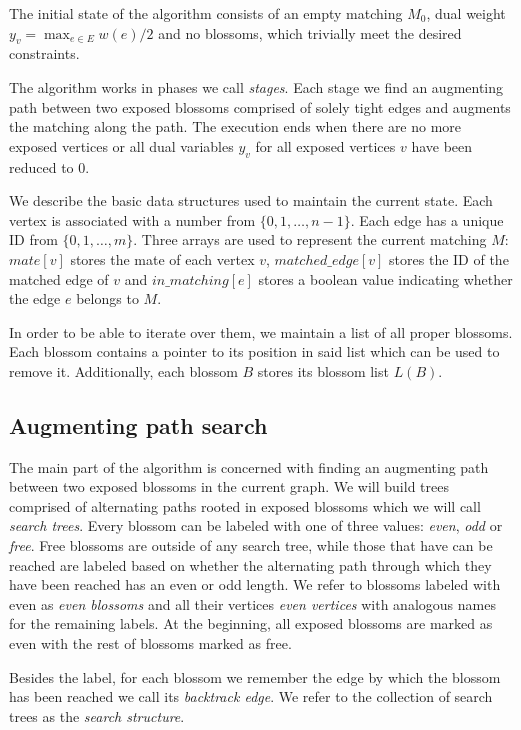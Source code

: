 The initial state of the algorithm consists of an empty matching $M_0$, dual weight $y_v = \max_{e \in E} w(e)/2$ and no blossoms, which trivially meet the desired constraints.

The algorithm works in phases we call \emph{stages}. Each stage we find an augmenting path between two exposed blossoms comprised of solely tight edges and augments the matching along the path. The execution ends when there are no more exposed vertices or all dual variables $y_v$ for all exposed vertices $v$ have been reduced to $0$.

We describe the basic data structures used to maintain the current state. Each vertex is associated with a number from $\{0, 1, \dots, n-1\}$. Each edge has a unique ID from $\{0, 1, \dots, m\}$. Three arrays are used to represent the current matching $M$: $mate[v]$ stores the mate of each vertex $v$, $matched\_edge[v]$ stores the ID of the matched edge of $v$ and $in\_matching[e]$ stores a boolean value indicating whether the edge $e$ belongs to $M$. 

In order to be able to iterate over them, we maintain a list of all proper blossoms. Each blossom contains a pointer to its position in said list which can be used to remove it. Additionally, each blossom $B$ stores its blossom list $L(B)$.

\subsection{Augmenting path search}

The main part of the algorithm is concerned with finding an augmenting path between two exposed blossoms in the current graph. We will build trees comprised of alternating paths rooted in exposed blossoms which we will call \emph{search trees}. Every blossom can be labeled with one of three values: \emph{even}, \emph{odd} or \emph{free}. Free blossoms are outside of any search tree, while those that have can be reached are labeled based on whether the alternating path through which they have been reached has an even or odd length. We refer to blossoms labeled with even as \emph{even blossoms} and all their vertices \emph{even vertices} with analogous names for the remaining labels. At the beginning, all exposed blossoms are marked as even with the rest of blossoms marked as free.

Besides the label, for each blossom we remember the edge by which the blossom has been reached we call its \emph{backtrack edge}. We refer to the collection of search trees as the \emph{search structure}.

